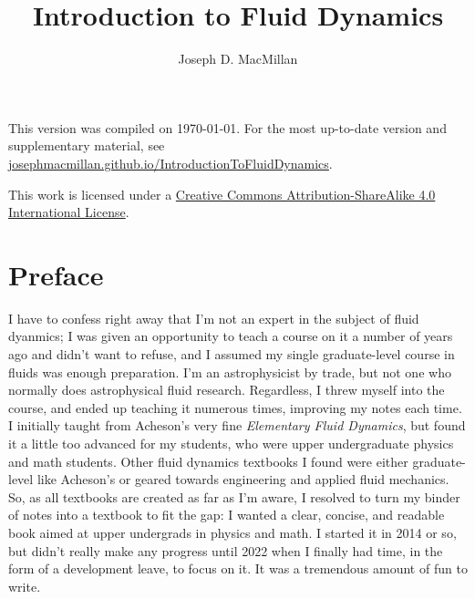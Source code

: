\documentclass[10pt, a5paper, twoside, openany]{memoir}
\title{Introduction to Fluid Dynamics}
\author{Joseph D. MacMillan}
\date{}
\begin{document}
\frontmatter

\maketitle

\vspace{1in}

\begin{center}
{\small

This version was compiled on \today.  For the most up-to-date version and supplementary material, see \href{https://josephmacmillan.github.io/IntroductionToFluidDynamics/index.html}{josephmacmillan.github.io/IntroductionToFluidDynamics}.

\vspace{2in}

This work is licensed under a \href{https://creativecommons.org/licenses/by-sa/4.0/}{Creative Commons Attribution-ShareAlike 4.0 International License}.
}
\end{center}


\newpage

\tableofcontents

\chapter{Preface}

I have to confess right away that I'm not an expert in the subject of fluid dyanmics; I was given an opportunity to teach a course on it a number of years ago and didn't want to refuse, and I assumed my single graduate-level course in fluids was enough preparation.  I'm an astrophysicist by trade, but not one who normally does astrophysical fluid research.  Regardless, I threw myself into the course, and ended up teaching it numerous times, improving my notes each time.  I initially taught from Acheson's very fine \emph{Elementary Fluid Dynamics}, but found it a little too advanced for my students, who were upper undergraduate physics and math students.  Other fluid dynamics textbooks I found were either graduate-level like Acheson's or geared towards engineering and applied fluid mechanics.  So, as all textbooks are created as far as I'm aware, I resolved to turn my binder of notes into a textbook to fit the gap: I wanted a clear, concise, and readable book aimed at upper undergrads in physics and math.  I started it in 2014 or so, but didn't really make any progress until 2022 when I finally had time, in the form of a development leave, to focus on it.  It was a tremendous amount of fun to write.
\end{document}
